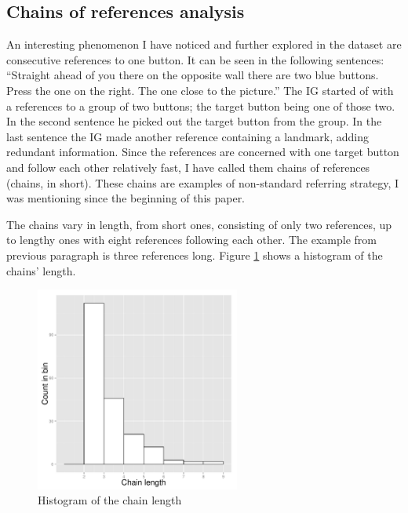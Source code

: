 \subsection{Chains of references analysis}
\label{subsec:dataset-chains}
An interesting phenomenon I have noticed and further explored in the dataset are consecutive references to one button. It can be seen in the following sentences: ``Straight ahead of you there on the opposite wall there are two blue buttons. Press the one on the right. The one close to the picture.'' The IG started of with a references to a group of two buttons; the target button being one of those two. In the second sentence he picked out the target button from the group. In the last sentence the IG made another reference containing a landmark, adding redundant information. Since the references are concerned with one target button and follow each other relatively fast, I have called them chains of references (chains, in short). These chains are examples of non-standard referring strategy, I was mentioning since the beginning of this paper.

The chains vary in length, from short ones, consisting of only two references, up to lengthy ones with eight references following each other. The example from previous paragraph is three references long. Figure \ref{fig:chains_len_histo} shows a histogram of the chains' length.

\begin{figure}[!htbp]
  \centering
	\includegraphics[width=0.6\textwidth]{Images/chains_len_histo}
	\caption{Histogram of the chain length}
	\label{fig:chains_len_histo}
\end{figure}

